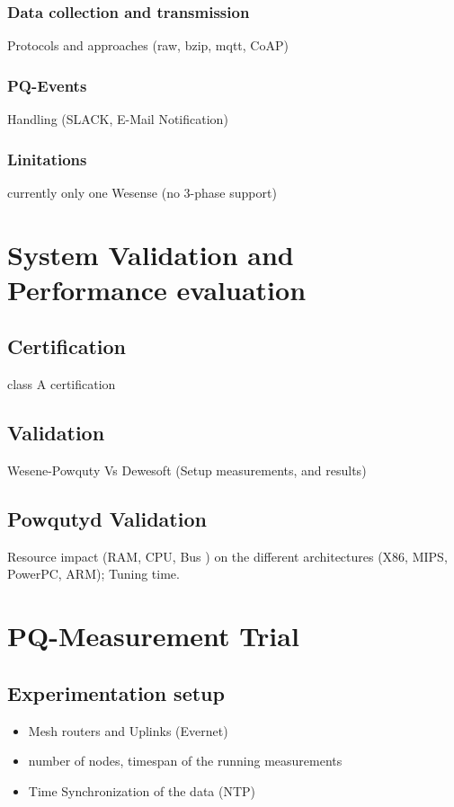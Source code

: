 \documentclass{sig-alternate}
\begin{document}
			\subsubsection{Data collection and transmission}
				Protocols and approaches (raw, bzip, mqtt, CoAP)
			\subsubsection{PQ-Events}
				Handling (SLACK, E-Mail Notification)
			\subsubsection{Linitations}
				currently only one Wesense (no 3-phase support)



	\section{System Validation and Performance evaluation}

		\subsection{Certification}
			class A certification 

		\subsection{Validation}
			Wesene-Powquty Vs Dewesoft (Setup measurements, and results)

		\subsection{Powqutyd Validation}
			Resource impact (RAM, CPU, Bus ) on the different architectures (X86, MIPS, PowerPC, ARM); Tuning time.

        \section{PQ-Measurement Trial}

		\subsection{Experimentation setup}
			\begin{itemize}
				\item Mesh routers and Uplinks (Evernet)
				\item number of nodes, timespan of the running measurements
				\item Time Synchronization of the data (NTP)
			\end{itemize}
		
\end{document}
